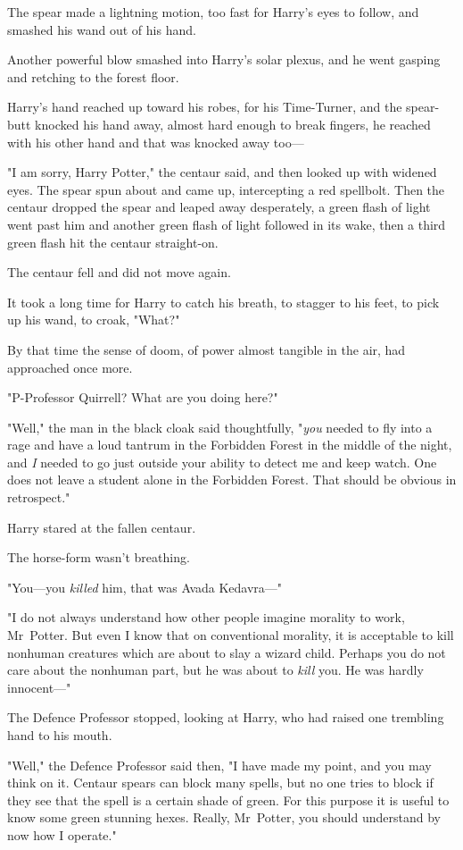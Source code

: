 The spear made a lightning motion, too fast for Harry's eyes to follow, and
smashed his wand out of his hand.

Another powerful blow smashed into Harry's solar plexus, and he went gasping
and retching to the forest floor.

Harry's hand reached up toward his robes, for his Time-Turner, and the
spear-butt knocked his hand away, almost hard enough to break fingers, he
reached with his other hand and that was knocked away too---

"I am sorry, Harry Potter," the centaur said, and then looked up with widened
eyes. The spear spun about and came up, intercepting a red spellbolt. Then the
centaur dropped the spear and leaped away desperately, a green flash of light
went past him and another green flash of light followed in its wake, then a
third green flash hit the centaur straight-on.

The centaur fell and did not move again.

It took a long time for Harry to catch his breath, to stagger to his feet, to
pick up his wand, to croak, "What?"

By that time the sense of doom, of power almost tangible in the air, had
approached once more.

"P-Professor Quirrell? What are you doing here?"

"Well," the man in the black cloak said thoughtfully, "\emph{you} needed to fly
into a rage and have a loud tantrum in the Forbidden Forest in the middle of
the night, and \emph{I} needed to go just outside your ability to detect me and
keep watch. One does not leave a student alone in the Forbidden Forest. That
should be obvious in retrospect."

Harry stared at the fallen centaur.

The horse-form wasn't breathing.

"You---you \emph{killed} him, that was Avada Kedavra---"

"I do not always understand how other people imagine morality to work,
Mr~Potter. But even I know that on conventional morality, it is acceptable to
kill nonhuman creatures which are about to slay a wizard child. Perhaps you do
not care about the nonhuman part, but he was about to \emph{kill} you. He was
hardly innocent---"

The Defence Professor stopped, looking at Harry, who had raised one trembling
hand to his mouth.

"Well," the Defence Professor said then, "I have made my point, and you may
think on it. Centaur spears can block many spells, but no one tries to block if
they see that the spell is a certain shade of green. For this purpose it is
useful to know some green stunning hexes. Really, Mr~Potter, you should
understand by now how I operate."

